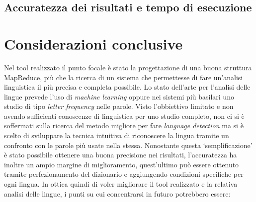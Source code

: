 \documentclass{article}
\newcommand{\MR}{MapReduce}
\begin{document}
\subsection{Accuratezza dei risultati e tempo di esecuzione}

\printHistogram{}

\printTimeGraph{}

\newpage
\section{Considerazioni conclusive}
Nel tool realizzato il punto focale è stato la progettazione di una buona struttura \MR{}, più che la ricerca di un sistema che permettesse di fare un'analisi linguistica il più precisa e completa possibile. Lo stato dell'arte per l'analisi delle lingue prevede l'uso di \textit{machine learning} oppure nei sistemi più basilari uno studio di tipo \textit{letter frequency} nelle parole. Visto l'obbiettivo limitato e non avendo sufficienti conoscenze di linguistica per uno studio completo, non ci si è soffermati sulla ricerca del metodo migliore per fare \textit{language detection} ma si è scelto di sviluppare la tecnica intuitiva di riconoscere la lingua tramite un confronto con le parole più usate nella stessa. Nonostante questa `semplificazione' è stato possibile ottenere una buona precisione nei risultati, l'accuratezza ha inoltre un ampio margine di miglioramento, quest'ultimo può essere ottenuto tramite perfezionamento del dizionario e aggiungendo condizioni specifiche per ogni lingua. In ottica quindi di voler migliorare il tool realizzato e la relativa analisi delle lingue, i punti su cui concentrarsi in futuro potrebbero essere:
\end{document}
